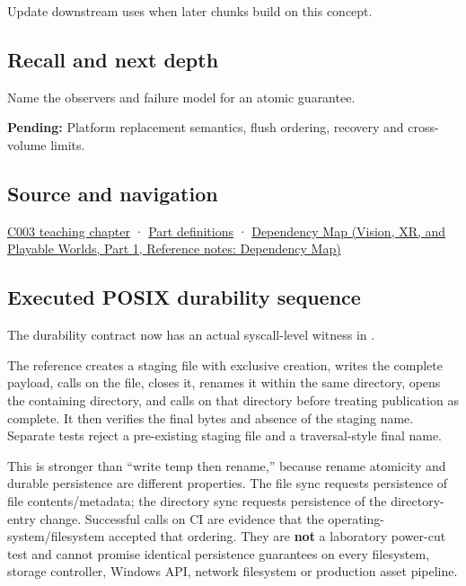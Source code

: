 \hypertarget{appendix-e89a8f290ef5-used-by}{}

Update downstream uses when later chunks build on this concept.

\subsection{Recall and next depth}\label{appendix-e89a8f290ef5-recall-and-next-depth}

\hypertarget{appendix-e89a8f290ef5-recall-and-next-depth}{}

Name the observers and failure model for an atomic guarantee.

\textbf{Pending:} Platform replacement semantics, flush ordering, recovery and cross-volume limits.

\subsection{Source and navigation}\label{appendix-e89a8f290ef5-source-and-navigation}

\hypertarget{appendix-e89a8f290ef5-source-and-navigation}{}

\hyperref[01-foundations-i-ch002-where-the-bytes-live]{C003 teaching chapter} · \hyperref[appendix-fd090d982a15-m003---parts-41-60]{Part definitions} · \href{../07-Vision-XR-and-Playable-Worlds-P01/main.pdf\#nameddest=appendix-4ad47bdd269a}{Dependency Map (Vision, XR, and Playable Worlds, Part 1, Reference notes: Dependency Map)}

\subsection{Executed POSIX durability sequence}\label{appendix-e89a8f290ef5-executed-posix-durability-sequence}

\hypertarget{appendix-e89a8f290ef5-executed-posix-durability-sequence}{}

The durability contract now has an actual syscall-level witness in .

The reference creates a staging file with exclusive creation, writes the complete payload, calls  on the file, closes it, renames it within the same directory, opens the containing directory, and calls  on that directory before treating publication as complete. It then verifies the final bytes and absence of the staging name. Separate tests reject a pre-existing staging file and a traversal-style final name.

This is stronger than ``write temp then rename,'' because rename atomicity and durable persistence are different properties. The file sync requests persistence of file contents/metadata; the directory sync requests persistence of the directory-entry change. Successful calls on CI are evidence that the operating-system/filesystem accepted that ordering. They are \textbf{not} a laboratory power-cut test and cannot promise identical persistence guarantees on every filesystem, storage controller, Windows API, network filesystem or production asset pipeline.
